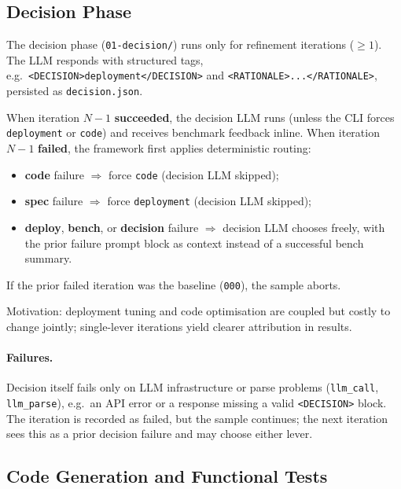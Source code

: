 \subsection{Decision Phase}
\label{sec:methods-decision}

The decision phase (\texttt{01-decision/}) runs only for refinement iterations
($\geq 1$).  The LLM responds with structured tags, e.g.\
\texttt{<DECISION>deployment</DECISION>} and
\texttt{<RATIONALE>...</RATIONALE>}, persisted as \texttt{decision.json}.

When iteration $N{-}1$ \textbf{succeeded}, the decision LLM runs (unless the
CLI forces \texttt{deployment} or \texttt{code}) and receives benchmark
feedback inline.  When iteration $N{-}1$ \textbf{failed}, the framework first
applies deterministic routing:
\begin{itemize}
  \item \textbf{code} failure $\Rightarrow$ force \texttt{code} (decision LLM
        skipped);
  \item \textbf{spec} failure $\Rightarrow$ force \texttt{deployment}
        (decision LLM skipped);
  \item \textbf{deploy}, \textbf{bench}, or \textbf{decision} failure
        $\Rightarrow$ decision LLM chooses freely, with the prior failure
        prompt block as context instead of a successful bench summary.
\end{itemize}
If the prior failed iteration was the baseline (\texttt{000}), the sample
aborts.

Motivation: deployment tuning and code optimisation are coupled but costly to
change jointly; single-lever iterations yield clearer attribution in results.

\paragraph{Failures.}
Decision itself fails only on LLM infrastructure or parse problems
(\texttt{llm\_call}, \texttt{llm\_parse}), e.g.\ an API error or a response
missing a valid \texttt{<DECISION>} block.  The iteration is recorded as
failed, but the sample continues; the next iteration sees this as a prior
decision failure and may choose either lever.


\subsection{Code Generation and Functional Tests}
\label{sec:methods-code}

